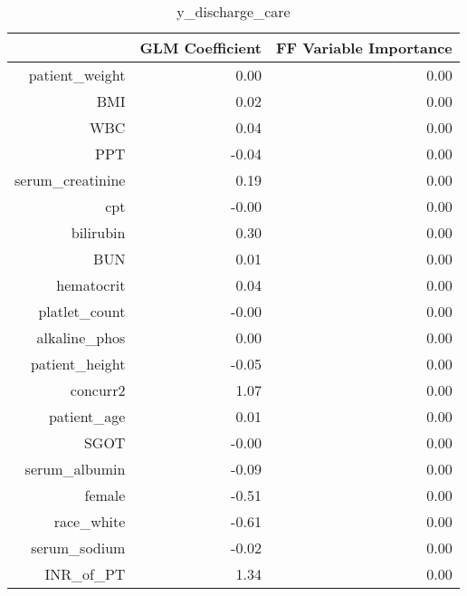 \begin{table}[ht]
\centering
\begin{tabular}{rrr}
  \hline
 & GLM Coefficient & FF Variable Importance \\ 
  \hline
patient\_weight & 0.00 & 0.00 \\ 
  BMI & 0.02 & 0.00 \\ 
  WBC & 0.04 & 0.00 \\ 
  PPT & -0.04 & 0.00 \\ 
  serum\_creatinine & 0.19 & 0.00 \\ 
  cpt & -0.00 & 0.00 \\ 
  bilirubin & 0.30 & 0.00 \\ 
  BUN & 0.01 & 0.00 \\ 
  hematocrit & 0.04 & 0.00 \\ 
  platlet\_count & -0.00 & 0.00 \\ 
  alkaline\_phos & 0.00 & 0.00 \\ 
  patient\_height & -0.05 & 0.00 \\ 
  concurr2 & 1.07 & 0.00 \\ 
  patient\_age & 0.01 & 0.00 \\ 
  SGOT & -0.00 & 0.00 \\ 
  serum\_albumin & -0.09 & 0.00 \\ 
  female & -0.51 & 0.00 \\ 
  race\_white & -0.61 & 0.00 \\ 
  serum\_sodium & -0.02 & 0.00 \\ 
  INR\_of\_PT & 1.34 & 0.00 \\ 
   \hline
\end{tabular}
\caption{y_discharge_care} 
\end{table}

